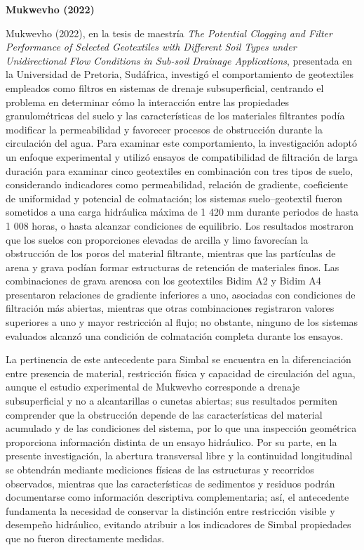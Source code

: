 \noindent\textbf{Mukwevho (2022)}

Mukwevho (2022), en la tesis de maestría \textit{The Potential Clogging and Filter Performance of Selected Geotextiles with Different Soil Types under Unidirectional Flow Conditions in Sub-soil Drainage Applications}, presentada en la Universidad de Pretoria, Sudáfrica, investigó el comportamiento de geotextiles empleados como filtros en sistemas de drenaje subsuperficial, centrando el problema en determinar cómo la interacción entre las propiedades granulométricas del suelo y las características de los materiales filtrantes podía modificar la permeabilidad y favorecer procesos de obstrucción durante la circulación del agua. Para examinar este comportamiento, la investigación adoptó un enfoque experimental y utilizó ensayos de compatibilidad de filtración de larga duración para examinar cinco geotextiles en combinación con tres tipos de suelo, considerando indicadores como permeabilidad, relación de gradiente, coeficiente de uniformidad y potencial de colmatación; los sistemas suelo–geotextil fueron sometidos a una carga hidráulica máxima de 1 420 mm durante periodos de hasta 1 008 horas, o hasta alcanzar condiciones de equilibrio. Los resultados mostraron que los suelos con proporciones elevadas de arcilla y limo favorecían la obstrucción de los poros del material filtrante, mientras que las partículas de arena y grava podían formar estructuras de retención de materiales finos. Las combinaciones de grava arenosa con los geotextiles Bidim A2 y Bidim A4 presentaron relaciones de gradiente inferiores a uno, asociadas con condiciones de filtración más abiertas, mientras que otras combinaciones registraron valores superiores a uno y mayor restricción al flujo; no obstante, ninguno de los sistemas evaluados alcanzó una condición de colmatación completa durante los ensayos.

La pertinencia de este antecedente para Simbal se encuentra en la diferenciación entre presencia de material, restricción física y capacidad de circulación del agua, aunque el estudio experimental de Mukwevho corresponde a drenaje subsuperficial y no a alcantarillas o cunetas abiertas; sus resultados permiten comprender que la obstrucción depende de las características del material acumulado y de las condiciones del sistema, por lo que una inspección geométrica proporciona información distinta de un ensayo hidráulico. Por su parte, en la presente investigación, la abertura transversal libre y la continuidad longitudinal se obtendrán mediante mediciones físicas de las estructuras y recorridos observados, mientras que las características de sedimentos y residuos podrán documentarse como información descriptiva complementaria; así, el antecedente fundamenta la necesidad de conservar la distinción entre restricción visible y desempeño hidráulico, evitando atribuir a los indicadores de Simbal propiedades que no fueron directamente medidas.


